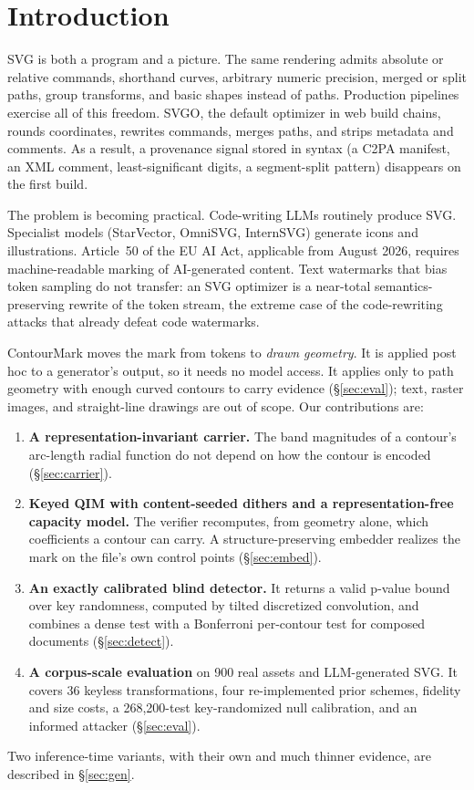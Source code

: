 \documentclass[10pt,twocolumn]{article}
\newcommand{\system}{ContourMark}
\begin{document}
\section{Introduction}
SVG is both a program and a picture. The same rendering admits absolute or relative commands, shorthand curves, arbitrary numeric precision, merged or split paths, group transforms, and basic shapes instead of paths. Production pipelines exercise all of this freedom. SVGO, the default optimizer in web build chains, rounds coordinates, rewrites commands, merges paths, and strips metadata and comments. As a result, a provenance signal stored in syntax (a C2PA manifest, an XML comment, least-significant digits, a segment-split pattern) disappears on the first build.

The problem is becoming practical. Code-writing LLMs routinely produce SVG. Specialist models (StarVector, OmniSVG, InternSVG) generate icons and illustrations. Article~50 of the EU AI Act, applicable from August 2026, requires machine-readable marking of AI-generated content. Text watermarks that bias token sampling do not transfer: an SVG optimizer is a near-total semantics-preserving rewrite of the token stream, the extreme case of the code-rewriting attacks that already defeat code watermarks.

\system{} moves the mark from tokens to \emph{drawn geometry}. It is applied post hoc to a generator's output, so it needs no model access. It applies only to path geometry with enough curved contours to carry evidence (\S\ref{sec:eval}); text, raster images, and straight-line drawings are out of scope. Our contributions are:
\begin{enumerate}
\item \textbf{A representation-invariant carrier.} The band magnitudes of a contour's arc-length radial function do not depend on how the contour is encoded (\S\ref{sec:carrier}).
\item \textbf{Keyed QIM with content-seeded dithers and a representation-free capacity model.} The verifier recomputes, from geometry alone, which coefficients a contour can carry. A structure-preserving embedder realizes the mark on the file's own control points (\S\ref{sec:embed}).
\item \textbf{An exactly calibrated blind detector.} It returns a valid p-value bound over key randomness, computed by tilted discretized convolution, and combines a dense test with a Bonferroni per-contour test for composed documents (\S\ref{sec:detect}).
\item \textbf{A corpus-scale evaluation} on 900 real assets and LLM-generated SVG. It covers 36 keyless transformations, four re-implemented prior schemes, fidelity and size costs, a 268{,}200-test key-randomized null calibration, and an informed attacker (\S\ref{sec:eval}).
\end{enumerate}
Two inference-time variants, with their own and much thinner evidence, are described in \S\ref{sec:gen}.
\end{document}
